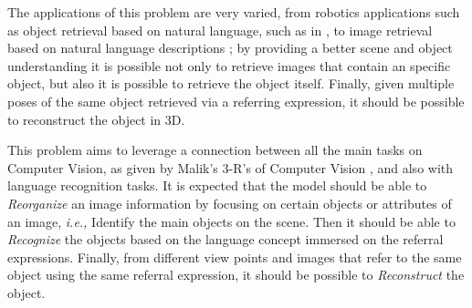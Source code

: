 The applications of this problem are very varied, from robotics applications such as object retrieval based on natural language, such as in \cite{guadarrama_understanding_2016}, to image retrieval based on natural language descriptions \cite{schuster2015generating}; by providing a better scene and object understanding it is possible not only to retrieve images that contain an specific object, but also it is possible to retrieve the object itself. Finally, given multiple poses of the same object retrieved via a referring expression, it should be possible to reconstruct the object in 3D.

This problem aims to leverage a connection between all the main tasks on Computer Vision, as given by Malik's 3-R's of Computer Vision \cite{malik2016three}, and also with language recognition tasks. It is expected that the model should be able to \emph{Reorganize} an image information by focusing on certain objects or attributes of an image, \textit{i.e.,} Identify the main objects on the scene. Then it should be able to \emph{Recognize} the objects based on the language concept immersed on the referral expressions. Finally, from different view points and images that refer to the same object using the same referral expression, it should be possible to \emph{Reconstruct} the object.
